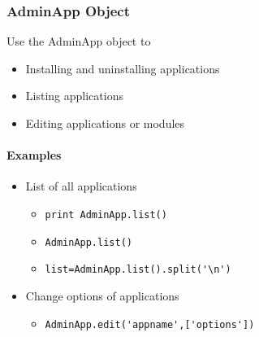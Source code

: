 \documentclass[12pt,a4paper]{article}
\begin{document}
\subsubsection{AdminApp Object}

Use the AdminApp object to
\begin{itemize}
\item Installing and uninstalling applications
\item Listing applications
\item Editing applications or modules
\end{itemize}

\paragraph{Examples}

\begin{itemize}
\item List of all applications
	\begin{itemize}
		\item \lstinline{print AdminApp.list()}
		\item \lstinline{AdminApp.list()}
		\item \lstinline{list=AdminApp.list().split('\n')}
	\end{itemize}
\item Change options of applications
	\begin{itemize}
		\item \lstinline{AdminApp.edit('appname',['options'])}
	\end{itemize}
\end{itemize}
\end{document}

